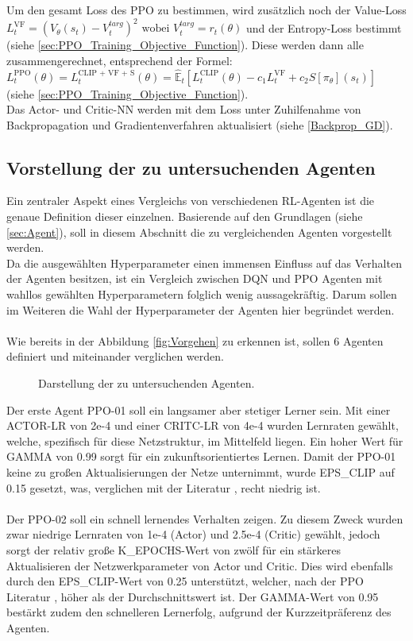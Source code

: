 Um den gesamt Loss des PPO zu bestimmen, wird zusätzlich noch der Value-Loss $L^{\text{VF}}_{t} = (V_{\theta}(s_{t})-V_{t}^{targ})^2 \text{ wobei } V_{t}^{targ} = r_{t}(\theta)$ und der Entropy-Loss bestimmt (siehe \ref{sec:PPO_Training_Objective_Function}). Diese werden dann alle zusammengerechnet, entsprechend der Formel: 
$L^\text{PPO}_{t} (\theta) = L^\text{CLIP + VF + S}_{t} (\theta) = \mathbb{\hat{E}}_{t} [L^{\text{CLIP}}_{t}(\theta) - c_{1}L^{\text{VF}}_{t} + c_{2}S[\pi_{\theta}](s_{t})]$ (siehe \ref{sec:PPO_Training_Objective_Function}).\\
Das Actor- und Critic-NN werden mit dem Loss unter Zuhilfenahme von Backpropagation und Gradientenverfahren aktualisiert (siehe \ref{Backprop_GD}).

\subsection{Vorstellung der zu untersuchenden Agenten}
Ein zentraler Aspekt eines Vergleichs von verschiedenen RL-Agenten ist die genaue Definition dieser einzelnen. 
Basierende auf den Grundlagen (siehe \ref{sec:Agent}), soll in diesem Abschnitt die zu vergleichenden Agenten vorgestellt werden.\\
Da die ausgewählten Hyperparameter einen immensen Einfluss auf das Verhalten der Agenten besitzen, ist ein Vergleich zwischen DQN und PPO Agenten mit wahllos gewählten Hyperparametern folglich wenig aussagekräftig. Darum sollen im Weiteren die Wahl der Hyperparameter der Agenten hier begründet werden.\\
\\Wie bereits in der Abbildung \ref{fig:Vorgehen} zu erkennen ist, sollen 6 Agenten definiert und miteinander verglichen werden.
\begin{figure}[H]
	\centering
	\def\svgscale{0.102}
	
	\caption[Agenten]{Darstellung der zu untersuchenden Agenten.}
	\label{fig:Agenten}
\end{figure}
Der erste Agent PPO-01 soll ein langsamer aber stetiger Lerner sein. Mit einer ACTOR-LR von 2e-4 und einer CRITC-LR von 4e-4 wurden Lernraten gewählt, welche, spezifisch für diese Netzstruktur, im Mittelfeld liegen. Ein hoher Wert für GAMMA von 0.99 sorgt für ein zukunftsorientiertes Lernen. Damit der PPO-01 keine zu großen Aktualisierungen der Netze unternimmt, wurde EPS\_CLIP auf 0.15 gesetzt, was, verglichen mit der Literatur \cite[S. 6]{PPO}, recht niedrig ist.\\
\\Der PPO-02 soll ein schnell lernendes Verhalten zeigen. Zu diesem Zweck wurden zwar niedrige Lernraten von 1e-4 (Actor) und 2.5e-4 (Critic) gewählt, jedoch sorgt der relativ große K\_EPOCHS-Wert von zwölf für ein stärkeres Aktualisieren der Netzwerkparameter von Actor und Critic. Dies wird ebenfalls durch den EPS\_CLIP-Wert von 0.25 unterstützt, welcher, nach der PPO Literatur \cite[S. 6]{PPO}, höher als der Durchschnittswert ist. Der GAMMA-Wert von 0.95 bestärkt zudem den schnelleren Lernerfolg, aufgrund der Kurzzeitpräferenz des Agenten.\\
